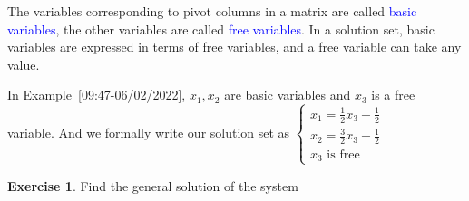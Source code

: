 \documentclass{beamer}
\theoremstyle{definition}
\newtheorem{exercise}[theorem]{Exercise}
\theoremstyle{remark}
\begin{document}
\begin{frame}[t]
\begin{definition}
The variables corresponding to pivot columns in a matrix are called \textcolor{blue}{basic variables}, 
the other variables are called \textcolor{blue}{free variables}. 
In a solution set, basic variables are expressed in terms of free variables, and a free variable can take any value.
\end{definition}
\pause
\begin{example}
In Example~\ref{09:47-06/02/2022}, $x_1,x_2$ are basic variables and $x_3$ is a free variable. And we formally write our solution set as $\begin{cases}
x_1=\frac{1}{2}x_3+\frac{1}{2} \\
x_2=\frac{3}{2}x_3-\frac{1}{2} \\
x_3\text{ is free}
\end{cases}$
\end{example}
\end{frame}

\begin{frame}[t]
\begin{exercise}\label{08:47-06/06/2022}
Find the general solution of the system 
\end{exercise}
\end{frame}
\end{document}
